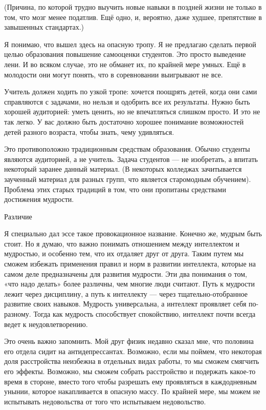 \documentclass[ebook,12pt,oneside,openany]{memoir}
\begin{document}
(Причина, по которой трудно выучить новые навыки в поздней жизни не
только в том, что мозг менее податлив. Ещё одно, и, вероятно, даже
худшее, препятствие в завышенных стандартах.)

Я понимаю, что вышел здесь на опасную тропу. Я не предлагаю сделать
первой целью образования повышение самооценки студентов. Это просто
выведение лени. И во всяком случае, это не обманет их, по крайней мере
умных. Ещё в молодости они могут понять, что в соревновании выигрывают
не все.

Учитель должен ходить по узкой тропе: хочется поощрять детей, когда
они сами справляются с задачами, но нельзя и одобрить все их
результаты. Нужно быть хорошей аудиторией: уметь ценить, но не
впечатляться слишком просто. И это не так легко. У вас должно быть
достаточно хорошее понимание возможностей детей разного возраста,
чтобы знать, чему удивляться.

Это противоположно традиционным средствам образования. Обычно студенты
являются аудиторией, а не учитель. Задача студентов — не изобретать, а
впитать некоторый заранее данный материал. (В некоторых колледжах
зачитывается заученный материал для разных групп, что является
старомодным обучением). Проблема этих старых традиций в том, что они
пропитаны средствами достижения мудрости.

Различие

Я специально дал эссе такое провокационное название. Конечно же,
мудрым быть стоит. Но я думаю, что важно понимать отношением между
интеллектом и мудростью, и особенно тем, что их отдаляет друг от
друга. Таким путем мы сможем избежать применения правил и норм в
развитии интеллекта, которые на самом деле предназначены для развития
мудрости. Эти два понимания о том, «что надо делать» более различны,
чем многие люди считают. Путь к мудрости лежит через дисциплину, а
путь к интеллекту — через тщательно-отобранное развитие своих навыков.
Мудрость универсальна, а интеллект проявляет себя по-разному. Тогда
как мудрость способствует спокойствию, интеллект почти всегда ведет к
неудовлетворению.

Это очень важно запомнить. Мой друг физик недавно сказал мне, что
половина его отдела сидит на антидепрессантах. Возможно, если мы
поймем, что некоторая доля расстройства неизбежна в отдельных видах
работы, то мы сможем смягчить его эффекты. Возможно, мы сможем собрать
расстройство и подержать какое-то время в стороне, вместо того чтобы
разрешать ему проявляться в каждодневным унынии, которое накапливается
в опасную массу. По крайней мере, мы можем не испытывать недовольства
от того что испытываем недовольство.
\end{document}
